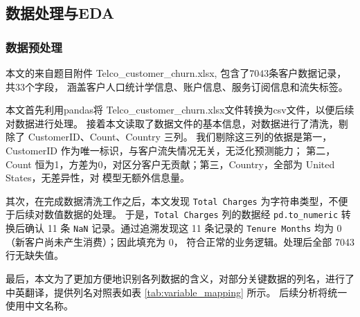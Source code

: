 \subsection{数据处理与EDA}

\subsubsection{数据预处理}

本文的来自题目附件 Telco\_customer\_churn.xlsx, 包含了$7043$条客户数据记录，共33个字段，
涵盖客户人口统计学信息、账户信息、服务订阅信息和流失标签。

本文首先利用pandas将 Telco\_customer\_churn.xlsx文件转换为csv文件，以便后续对数据进行处理。
接着本文读取了数据文件的基本信息，对数据进行了清洗，剔除了 CustomerID、Count、Country 三列。
我们剔除这三列的依据是第一，CustomerID 作为唯一标识，与客户流失情况无关，无泛化预测能力；
第二，Count 恒为1，方差为0，对区分客户无贡献；第三，Country，全部为 United States，无差异性，对
模型无额外信息量。

其次，在完成数据清洗工作之后，本文发现 \texttt{Total Charges}
为字符串类型，不便于后续对数值数据的处理。
于是，\texttt{Total Charges} 列的数据经 \texttt{pd.to\_numeric}
转换后确认 11 条 \texttt{NaN} 记录。通过追溯发现这 11 条记录的
\texttt{Tenure Months} 均为 0（新客户尚未产生消费）；因此填充为 0，
符合正常的业务逻辑。处理后全部 7043 行无缺失值。

最后，本文为了更加方便地识别各列数据的含义，对部分关键数据的列名，进行了中英翻译，提供列名对照表如表 \ref{tab:variable_mapping} 所示。
后续分析将统一使用中文名称。

